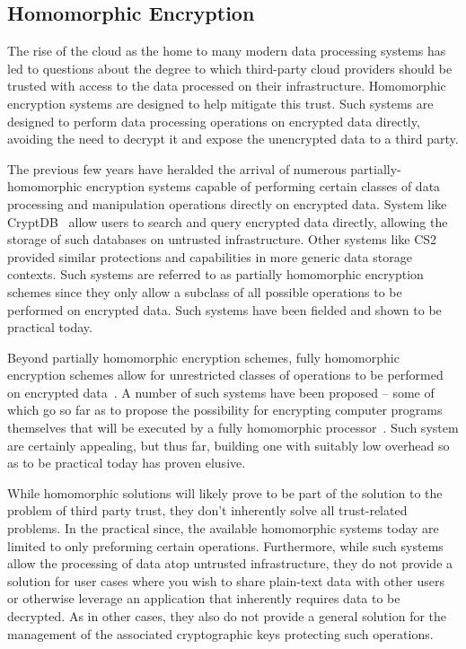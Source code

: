 \subsection{Homomorphic Encryption}

The rise of the cloud as the home to many modern data processing
systems has led to questions about the degree to which third-party
cloud providers should be trusted with access to the data processed on
their infrastructure. Homomorphic encryption systems are designed to
help mitigate this trust. Such systems are designed to perform data
processing operations on encrypted data directly, avoiding the need to
decrypt it and expose the unencrypted data to a third party.

The previous few years have heralded the arrival of numerous
partially-homomorphic encryption systems capable of performing certain
classes of data processing and manipulation operations directly on
encrypted data. System like CryptDB~\cite{popa2011} allow users to
search and query encrypted data directly, allowing the storage of such
databases on untrusted infrastructure. Other systems like
CS2~\cite{kamara2011} provided similar protections and capabilities in
more generic data storage contexts. Such systems are referred to as
partially homomorphic encryption schemes since they only allow a
subclass of all possible operations to be performed on encrypted
data. Such systems have been fielded and shown to be practical today.

Beyond partially homomorphic encryption schemes, fully homomorphic
encryption schemes allow for unrestricted classes of operations to be
performed on encrypted data~\cite{gentry2009}. A number of such
systems have been proposed -- some of which go so far as to propose
the possibility for encrypting computer programs themselves that will
be executed by a fully homomorphic processor~\cite{Breuer2013,
  Brenner2011}. Such system are certainly appealing, but thus far,
building one with suitably low overhead so as to be practical today
has proven elusive.

While homomorphic solutions will likely prove to be part of the
solution to the problem of third party trust, they don't inherently
solve all trust-related problems. In the practical since, the
available homomorphic systems today are limited to only preforming
certain operations. Furthermore, while such systems allow the
processing of data atop untrusted infrastructure, they do not provide
a solution for user cases where you wish to share plain-text data with
other users or otherwise leverage an application that inherently
requires data to be decrypted. As in other cases, they also do not
provide a general solution for the management of the associated
cryptographic keys protecting such operations.

